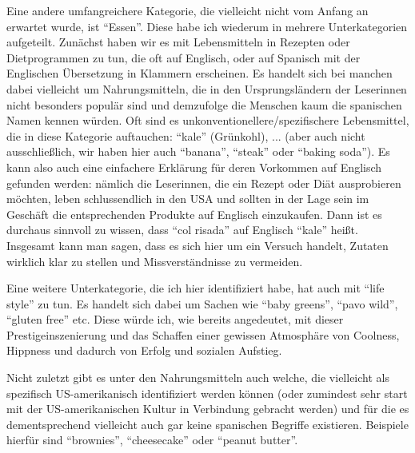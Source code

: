 Eine andere umfangreichere Kategorie, die vielleicht nicht vom Anfang an erwartet wurde, ist ``Essen''.
Diese habe ich wiederum in mehrere Unterkategorien aufgeteilt.
Zunächst haben wir es mit Lebensmitteln in Rezepten oder Dietprogrammen zu tun, die oft auf Englisch, oder auf Spanisch mit der Englischen Übersetzung in Klammern erscheinen.
Es handelt sich bei manchen dabei vielleicht um Nahrungsmitteln, die in den Ursprungsländern der Leserinnen nicht besonders populär sind und demzufolge die Menschen kaum die spanischen Namen kennen würden.
Oft sind es unkonventionellere/spezifischere Lebensmittel, die in diese Kategorie auftauchen: ``kale'' (Grünkohl), ... (aber auch nicht ausschließlich, wir haben hier auch ``banana'', ``steak'' oder ``baking soda''). %
Es kann also auch eine einfachere Erklärung für deren Vorkommen auf Englisch gefunden werden:
nämlich die Leserinnen, die ein Rezept oder Diät ausprobieren möchten, leben schlussendlich in den USA und sollten in der Lage sein im Geschäft die entsprechenden Produkte auf Englisch einzukaufen.
Dann ist es durchaus sinnvoll zu wissen, dass ``col risada'' auf Englisch ``kale'' heißt.
Insgesamt kann man sagen, dass es sich hier um ein Versuch handelt, Zutaten wirklich klar zu stellen und Missverständnisse zu vermeiden.

Eine weitere Unterkategorie, die ich hier identifiziert habe, hat auch mit ``life style'' zu tun.
Es handelt sich dabei um Sachen wie ``baby greens'', ``pavo wild'', ``gluten free'' etc.
Diese würde ich, wie bereits angedeutet, mit dieser Prestigeinszenierung und das Schaffen einer gewissen Atmosphäre von Coolness, Hippness und dadurch von Erfolg und sozialen Aufstieg. %

Nicht zuletzt gibt es unter den Nahrungsmitteln auch welche, die vielleicht als spezifisch US-amerikanisch identifiziert werden können (oder zumindest sehr start mit der US-amerikanischen Kultur in Verbindung gebracht werden) und für die es dementsprechend vielleicht auch gar keine spanischen Begriffe existieren.
Beispiele hierfür sind ``brownies'', ``cheesecake'' oder ``peanut butter''.

